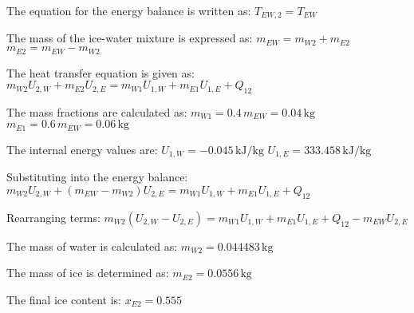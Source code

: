 The equation for the energy balance is written as:  
\( T_{EW,2} = T_{EW} \)  

The mass of the ice-water mixture is expressed as:  
\( m_{EW} = m_{W2} + m_{E2} \)  
\( m_{E2} = m_{EW} - m_{W2} \)  

The heat transfer equation is given as:  
\( m_{W2} U_{2,W} + m_{E2} U_{2,E} = m_{W1} U_{1,W} + m_{E1} U_{1,E} + Q_{12} \)  

The mass fractions are calculated as:  
\( m_{W1} = 0.4 \, m_{EW} = 0.04 \, \text{kg} \)  
\( m_{E1} = 0.6 \, m_{EW} = 0.06 \, \text{kg} \)  

The internal energy values are:  
\( U_{1,W} = -0.045 \, \text{kJ/kg} \)  
\( U_{1,E} = 333.458 \, \text{kJ/kg} \)  

Substituting into the energy balance:  
\( m_{W2} U_{2,W} + (m_{EW} - m_{W2}) U_{2,E} = m_{W1} U_{1,W} + m_{E1} U_{1,E} + Q_{12} \)  

Rearranging terms:  
\( m_{W2} (U_{2,W} - U_{2,E}) = m_{W1} U_{1,W} + m_{E1} U_{1,E} + Q_{12} - m_{EW} U_{2,E} \)  

The mass of water is calculated as:  
\( m_{W2} = 0.044483 \, \text{kg} \)  

The mass of ice is determined as:  
\( m_{E2} = 0.0556 \, \text{kg} \)  

The final ice content is:  
\( x_{E2} = 0.555 \)